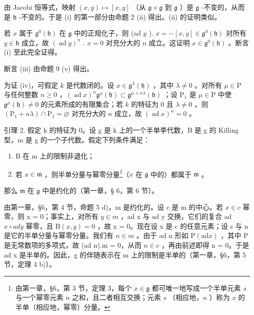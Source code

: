 由 Jacobi 恒等式，映射 \((x,y)\mapsto [x,y]\) （从 \(\mathfrak{g}\times \mathfrak{g}\) 到 \(\mathfrak{g}\) ）是 \(\mathfrak{g}\) -不变的，从而是 \(\mathfrak{h}\) -不变的。于是 (i) 的第一部分由命题 2 (ii) 得出。(ii) 的证明类似。

若 \(x\) 属于 \(\mathfrak{g}^0(\mathfrak{h})\) 在 \(\mathfrak{g}\) 中的正规化子，则 (ad \(y\) ). \(x = -[x, y] \in \mathfrak{g}^0(\mathfrak{h})\) 对所有 \(y \in \mathfrak{h}\) 成立，故 \((\operatorname{ad} y)^n\) . \(x = 0\) 对充分大的 \(n\) 成立。这证明 \(x \in \mathfrak{g}^0(\mathfrak{h})\) 。断言 (i) 至此完全证得。

断言 (iii) 由命题 9 (v) 得出。

为证 (iv)，可假定 \(k\) 是代数闭的。设 \(x \in \mathfrak{g}^{\lambda}(\mathfrak{h})\) ，其中 \(\lambda \neq 0\) 。对所有 \(\mu \in \mathrm{P}\) 与任何整数 \(n \geq 0\) ，\((\operatorname{ad} x)^n \mathfrak{g}^\mu(\mathfrak{h}) \subset \mathfrak{g}^{\mu + n\lambda}(\mathfrak{h})\) ；设 \(\mathrm{P}_1\) 是 \(\mu \in \mathrm{P}\) 中使 \(\mathfrak{g}^\mu(\mathfrak{h}) \neq 0\) 的元素所成的有限集合；若 \(k\) 的特征为 0 且 \(\lambda \neq 0\) ，则 \((\mathrm{P}_1 + n\lambda) \cap \mathrm{P}_1 = \varnothing\) 对充分大的 \(n\) 成立，故 \((\operatorname{ad} x)^n = 0\) 。

引理 2. 假定 k 的特征为 0。设 g 是 k 上的一个半单李代数，B 是 g 的 Killing 型，m 是 g 的一个子代数。假定下列条件满足：

\begin{enumerate}
\def\labelenumi{\arabic{enumi})}
\item
  B 在 m 上的限制非退化；
\item
  若 \(x \in \mathfrak{m}\) ，则半单分量与幂零分量\footnote{由第一章，§6，第 3 节，定理 3，每个 \(x \in \mathfrak{g}\) 都可唯一地写成一个半单元素 \(s\) 与一个幂零元素 \(n\) 之和，且二者相互交换；元素 \(s\) （相应地，\(n\) ）称为 \(x\) 的半单（相应地，幂零）分量。}（\(x\) 在 \(\mathfrak{g}\) 中的）都属于 \(\mathfrak{m}\) 。
\end{enumerate}

那么 \(\mathfrak{m}\) 在 \(\mathfrak{g}\) 中是约化的（第一章，§ 6，第 6 节）。

由第一章，§6，第 4 节，命题 5 d)，m 是约化的。设 c 是 m 的中心。若 \(x \in c\) 幂零，则 x = 0；事实上，对所有 \(y \in m\) ，ad x 与 ad y 交换，它们的复合 ad \(x \circ ad y\) 幂零，且 \(\mathrm{B}(x, y) = 0\) ，故 x = 0。现在设 x 是 c 的任意元素；设 s 与 n 是它的半单分量与幂零分量。我们有 \(n \in m\) 。由于 ad n 形如 \(\mathrm{P}(\mathrm{ad}x)\) ，其中 P 是无常数项的多项式，故 (ad n).m = 0，从而 \(n \in c\) ，再由前述即得 n = 0。于是 ad x 是半单的。因此，g 的伴随表示在 m 上的限制是半单的（第一章，§6，第 5 节，定理 4 b)）。

